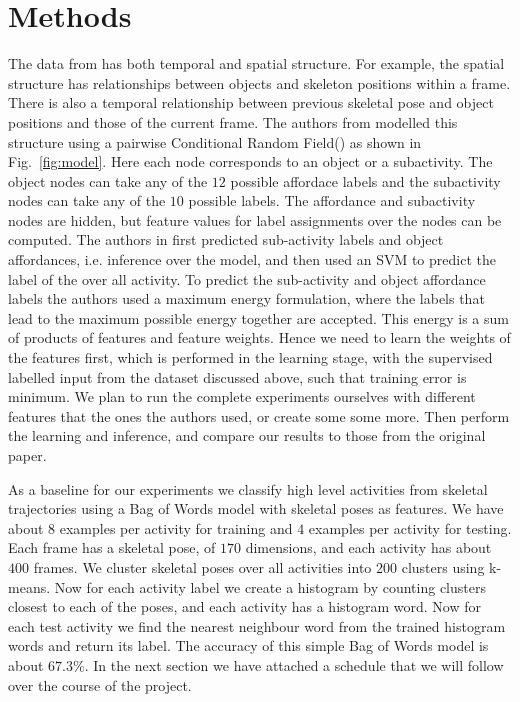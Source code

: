 \documentclass{article} %
\begin{document}
\section{Methods}
The data from \cite{koppula2013detectingactivitiesrgbd} has both temporal and spatial structure. For example, the spatial structure has relationships between objects and skeleton positions within a frame. There is also a temporal relationship between previous skeletal pose and object positions and those of the current frame. The authors from \cite{koppula2013detectingactivitiesrgbd} modelled this structure using a pairwise Conditional Random Field(\cite{sutton06introduction}) as shown in 
Fig.~\ref{fig:model}. 
Here each node corresponds to an object or a subactivity. The object nodes can take any of the $12$ possible affordace labels and the subactivity nodes can take any of the $10$ possible labels. The affordance and subactivity nodes are hidden, but feature values for label assignments over the nodes can be computed. The authors in \cite{koppula2013detectingactivitiesrgbd} first predicted sub-activity labels and object affordances, i.e. inference over the model, and then used an SVM to predict the label of the over all activity. To predict the sub-activity and object affordance labels the authors used a maximum energy formulation, where the labels that lead to the maximum possible energy together are accepted. This energy is a sum of products of features and feature weights. Hence we need to learn the weights of the features first, which is performed in the learning stage, with the supervised labelled input from the dataset discussed above, such that training error is minimum. We plan to run the complete experiments ourselves with different features that the ones the authors used, or create some some more. Then perform the learning and inference, and compare our results to those from the original paper. 

As a baseline for our experiments we classify high level activities from skeletal trajectories using a Bag of Words model \cite{Sivic03} with skeletal poses as features. We have about $8$ examples per activity for training and $4$ examples per activity for testing. Each frame has a skeletal pose, of $170$ dimensions, and each activity has about $400$ frames. We cluster skeletal poses over all activities into $200$ clusters using k-means. Now for each activity label we create a histogram by counting clusters closest to each of the poses, and each activity has a histogram word. Now for each test activity we find the nearest neighbour word from the trained histogram words and return its label. The accuracy of this simple Bag of Words model is about $67.3\%$.  In the next section we have attached a schedule that we will follow over the course of the project.
\end{document}
